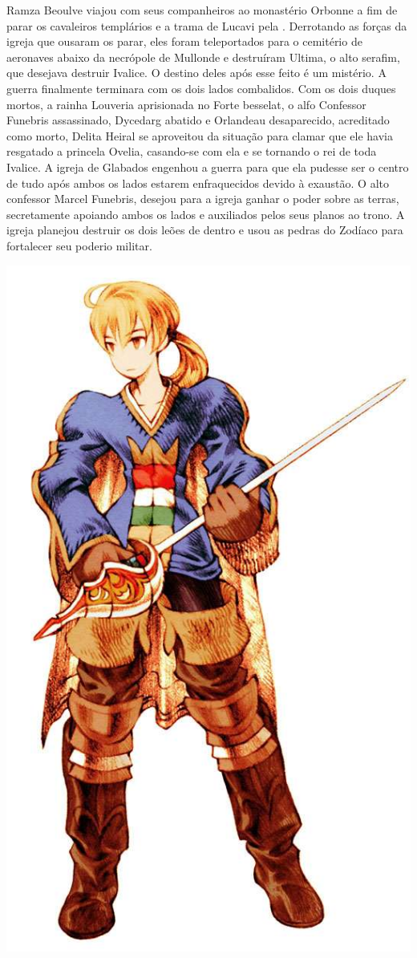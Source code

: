 Ramza Beoulve viajou com seus companheiros ao monastério Orbonne a fim de parar os cavaleiros templários e a trama de Lucavi pela .
Derrotando as forças da igreja que ousaram os parar, eles foram teleportados para o cemitério de aeronaves abaixo da necrópole de Mullonde e destruíram Ultima, o alto serafim, que desejava destruir Ivalice.
O destino deles após esse feito é um mistério.
A guerra finalmente terminara com os dois lados combalidos.
Com os dois duques mortos, a rainha Louveria aprisionada no Forte besselat, o alfo Confessor Funebris assassinado, Dycedarg abatido e Orlandeau desaparecido, acreditado como morto, Delita Heiral se aproveitou da situação para clamar que ele havia resgatado a princela Ovelia, casando-se com ela e se tornando o rei de toda Ivalice.
A igreja de Glabados engenhou a guerra para que ela pudesse ser o centro de tudo após ambos os lados estarem enfraquecidos devido à exaustão.
O alto confessor Marcel Funebris, desejou para a igreja ganhar o poder sobre as terras, secretamente apoiando ambos os lados e auxiliados pelos seus planos ao trono.
A igreja planejou destruir os dois leões de dentro e usou as pedras do Zodíaco para fortalecer seu poderio militar.
%
\ofpar
%
\\
%
\begin{center}\includegraphics[width=0.85\columnwidth]{./art/worldbook/ramza.jpg}\end{center}
